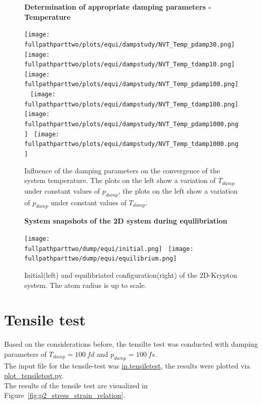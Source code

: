 \documentclass[10pt,a4paper]{report}
\def \pathparttwo {../../2_Two-dimensional_atomic_tensile_test}
\def \fullpathparttwo {/home/lukas/Desktop/project/independence/atomistic_modeling/exam/2_Two-dimensional_atomic_tensile_test}
\newcommand*{\figuretitle}[1]{%
    {\centering%
    \textbf{#1}%
    \par\medskip}%
}
\begin{document}
\begin{center}
\begin{figure}[h]
\figuretitle{Determination of appropriate damping parameters - Temperature}
\texttt{[image: \\fullpathparttwo/plots/equi/dampstudy/NVT\_Temp\_pdamp30.png]}~
\texttt{[image: \\fullpathparttwo/plots/equi/dampstudy/NVT\_Temp\_tdamp10.png]}
\texttt{[image: \\fullpathparttwo/plots/equi/dampstudy/NVT\_Temp\_pdamp100.png]}~
\texttt{[image: \\fullpathparttwo/plots/equi/dampstudy/NVT\_Temp\_tdamp100.png]}
\texttt{[image: \\fullpathparttwo/plots/equi/dampstudy/NVT\_Temp\_pdamp1000.png]}~
\texttt{[image: \\fullpathparttwo/plots/equi/dampstudy/NVT\_Temp\_tdamp1000.png]}
\caption[Determination of appropriate damping parameters - Temperature]{Influence of the damping parameters on the convergence of the system temperature. The plots on the left show a variation of $T_{damp}$ under constant values of $p_{damp}$, the plots on the left show a variation of $p_{damp}$ under constant values of $T_{damp}$.}
\label{fig:p2_dampstudy_Temp}
\end{figure}
\end{center}


\begin{center}
\begin{figure}[h]
\figuretitle{System snapshots of the 2D system during equilibriation}
\texttt{[image: \\fullpathparttwo/dump/equi/initial.png]}~
\texttt{[image: \\fullpathparttwo/dump/equi/equilibrium.png]}
\caption[System snapshots of the 2D system during equilibriation]{Initial(left) and equilibriated configuration(right) of the 2D-Krypton system. The atom radius is up to scale.}
\label{fig:p2_equi_ovito}
\end{figure}
\end{center}



\section{Tensile test}
Based on the considerations before, the tensilte test was conducted with damping parameters of $T_{damp}=100~fd$ and $p_{damp}=100~fs$.\\
The input file for the tensile-test was \href{\pathparttwo/in.tensiletest}{in.tensiletest}, the results were plotted via \href{\pathparttwo/plot_tensiletest.py}{plot\_tensiletest.py}.\\
The results of the tensile test are visualized in Figure~\ref{fig:p2_stress_strain_relation}.
\end{document}
